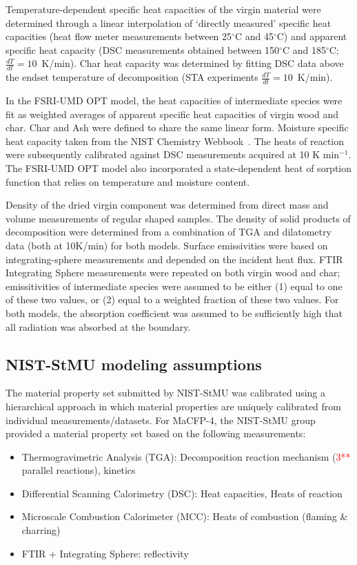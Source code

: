 \documentclass{article}
\begin{document}
Temperature-dependent specific heat capacities of the virgin material were determined through a linear interpolation of `directly measured' specific heat capacities (heat flow meter measurements between 25$^\circ$C and 45$^\circ$C) and apparent specific heat capacity (DSC measurements obtained between 150$^\circ$C and 185$^\circ$C; $\frac{dT}{dt}=10$~K/min). Char heat capacity was determined by fitting DSC data above the endset temperature of decomposition (STA experiments $\frac{dT}{dt}=10$~K/min).

In the FSRI-UMD OPT model, the heat capacities of intermediate species were fit as weighted averages of apparent specific heat capacities of virgin wood and char. Char and Ash were defined to share the same linear form. Moisture specific heat capacity taken from the NIST Chemistry Webbook~\cite{linstrom2001nist}. The heats of reaction were subsequently calibrated against DSC measurements acquired at 10 K min$^{-1}$. The FSRI-UMD OPT model also incorporated a state-dependent heat of sorption function that relies on temperature and moisture content. 

Density of the dried virgin component was determined from direct mass and volume measurements of regular shaped samples. The density of solid products of decomposition were determined from a combination of TGA and dilatometry data (both at 10K/min) for both models.
Surface emissivities were based on integrating-sphere measurements and depended on the incident heat flux. FTIR Integrating Sphere measurements were repeated on both virgin wood and char; emissitivities of intermediate species were assumed to be either (1) equal to one of these two values, or (2) equal to a weighted fraction of these two values. For both models, the absorption coefficient was assumed to be sufficiently high that all radiation was absorbed at the boundary. 

\subsection{NIST-StMU modeling assumptions}

The material property set submitted by NIST-StMU was calibrated using a hierarchical approach in which material properties are uniquely calibrated from individual measurements/datasets. For MaCFP-4, the NIST-StMU group provided a material property set based on the following measurements:
\begin{itemize}
	\item Thermogravimetric Analysis (TGA): Decomposition reaction mechanism (\textcolor{red}{3**} parallel reactions), kinetics
	\item Differential Scanning Calorimetry (DSC): Heat capacities, Heats of reaction
	\item Microscale Combustion Calorimeter (MCC): Heats of combustion (flaming & charring) 
	\item  FTIR + Integrating Sphere: reflectivity
\end{itemize}
\end{document}

